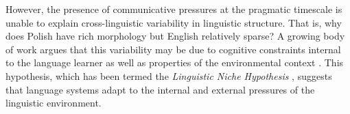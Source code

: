 \documentclass[10pt,letterpaper]{article}
\begin{document}

However, the presence of communicative pressures at the pragmatic timescale is unable to explain cross-linguistic variability in linguistic structure. That is, why does Polish have rich morphology but English relatively sparse? A growing body of work argues that this variability may be due to cognitive constraints internal to the language learner \cite{chater2010language} as well as properties of the environmental context \cite{nettle2012social}. This hypothesis, which has been termed the  {\it Linguistic Niche Hypothesis} \cite{lupyan2010language,wray2007consequences}, suggests that language systems adapt to the internal and external pressures of  the linguistic environment. %




\end{document}
